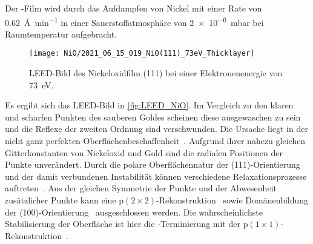         Der -Film wird durch das Aufdampfen von Nickel mit einer Rate von \SI{0.62}{\angstrom\per\minute} in einer Sauerstoffatmosphäre von \SI{2e-6}{\milli\bar} bei Raumtemperatur aufgebracht.
        \begin{figure}
            \centering
            \texttt{[image: NiO/2021\_06\_15\_019\_NiO(111)\_73eV\_Thicklayer]}
            \caption{LEED-Bild des Nickeloxidfilm (111) bei einer Elektronenenergie von \SI{73}{\electronvolt}.}
            \label{fig:LEED_NiO}
        \end{figure}
        Es ergibt sich das LEED-Bild in \autoref{fig:LEED_NiO}.
        Im Vergleich zu den klaren und scharfen Punkten des sauberen Goldes scheinen diese ausgewaschen zu sein und die Reflexe der zweiten Ordnung sind verschwunden.
        Die Ursache liegt in der nicht ganz perfekten Oberflächenbeschaffenheit~\cite{NiO_34}.
        Aufgrund ihrer nahezu gleichen Gitterkonstanten von Nickeloxid und Gold sind die radialen Positionen der Punkte unverändert.
        Durch die polare Oberflächennatur der (111)-Orientierung und der damit verbundenen Instabilität können verschiedene Relaxationsprozesse auftreten~\cite{NiO_36, NiO_35, NiO_34, NiO_27, NiO_10}.
        Aus der gleichen Symmetrie der Punkte und der Abwesenheit zusätzlicher Punkte kann eine $\text{p}(2 \times 2)$-Rekonstruktion~\cite{NiO_37} sowie Domänenbildung der (100)-Orientierung~\cite{NiO_36} ausgeschlossen werden.
        Die wahrscheinlichste Stabilisierung der Oberfläche ist hier die -Terminierung mit der $\text{p}(1 \times 1)$-Rekonstruktion~\cite{NiO_35}.

